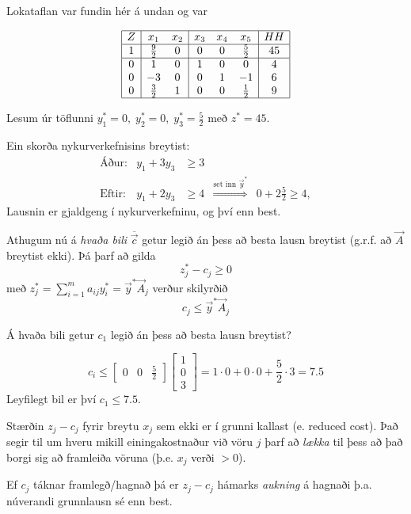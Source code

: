 \begin{lausn}Lokataflan var fundin hér á undan og var 
  \begin{center}
{\renewcommand{\arraystretch}{1.5} \renewcommand{\tabcolsep}{0.2cm}
{\scriptsize
\[\begin{array}{|c|cc|ccc|c|} \hline 
 Z &  x_1 &  x_2 & x_3 & x_4 & x_5 &  HH  \\ \hline
 1 & \frac{9}{2} & 0 & 0 & 0 & \frac{5}{2}& 45 \\ \hline
 0 &    1 & 0 & 1 & 0 & 0   & 4 \\ 
 0 &   -3 & 0 & 0 & 1 &-1   & 6 \\ 
 0 &  \frac{3}{2} & 1 & 0 & 0 & \frac{1}{2} & 9 \\ \hline 
\end{array}\]
}}\end{center} 
Lesum úr töflunni $y_1^*=0,\;y_2^*=0,\;y_3^*=\frac{5}{2}$ með $z^*=45$.

Ein skorða nykurverkefnisins breytist:
\[\begin{array}{llrcc}
 \mbox{Áður:} & y_1+3y_3 &\geq 3 \\
 \mbox{Eftir:} & y_1+2y_3 &\geq 4  &\stackrel{{\scriptstyle \mbox{set inn } \vec{y}^*}}{\Longrightarrow}& 0+2\frac{5}{2}\geq 4,
\end{array}\]
Lausnin er gjaldgeng í nykurverkefninu, og því enn best.
\end{lausn}

Athugum nú á \emph{hvaða bili} $\overline{\vec{c}}$ getur legið án þess að besta lausn breytist (g.r.f. að $\vec{A}$ breytist ekki). Þá þarf að gilda 
$$z_j^*-c_j\geq0$$ með $z_j^*=\sum_{i=1}^m a_{ij}y_i^*=\vec{y}^*\vec{A}_j$ verður skilyrðið $$c_j\leq \vec{y}^*\vec{A}_j$$
\begin{daemi}\label{wyndor:naemni3} Á hvaða bili getur $c_1$ legið án þess að besta lausn breytist?  
\end{daemi}
\begin{lausn}
 $$c_i\leq \begin{bmatrix}0&0&\frac{5}{2}\end{bmatrix}\begin{bmatrix}1\\0\\3\end{bmatrix}=1\cdot0+0\cdot0+\frac{5}{2}\cdot3=7.5$$
Leyfilegt bil er því $c_1\leq7.5$.
\end{lausn}
\begin{aths}Stærðin $z_j-c_j$ fyrir breytu $x_j$ sem ekki er í grunni kallast  (e. reduced cost). Það segir til um hveru mikill einingakostnaður við vöru $j$ þarf að \emph{lækka} til þess að það borgi sig að framleiða vöruna (þ.e. $x_j$ verði $>0$). 

Ef $c_j$ táknar framlegð/hagnað þá er $z_j-c_j$ hámarks \emph{aukning} á hagnaði þ.a. núverandi grunnlausn sé enn best.
 
\end{aths}

